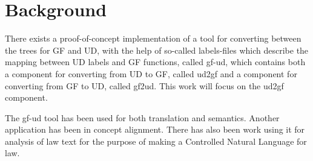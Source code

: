 \documentclass{article}
\begin{document}




\section{Background}

There exists a proof-of-concept implementation of a tool for converting between the trees for GF and UD,
with the help of so-called labels-files which describe the mapping between UD labels and GF functions,
called gf-ud, which contains both a component for converting from UD to GF, called ud2gf\cite{kolachina-ranta-2017}
and a component for converting from GF to UD, called gf2ud\cite{kolachina-ranta-2016}. This work will focus on the ud2gf component.


The gf-ud tool has been used for both translation and semantics\cite{ranta2020abstract}. %
Another application has been in concept alignment\cite{masciolini2021grammar}.
There has also been work using it for analysis of law text for the purpose of making a Controlled Natural Language for law\cite{listenmaa-etal-2021-towards}.
\end{document}
